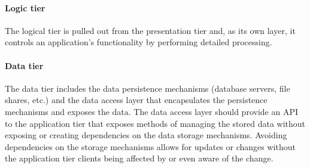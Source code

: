 \paragraph{Logic tier}
The logical tier is pulled out from the presentation tier and, as its own layer, it controls an application’s functionality by performing detailed processing.

\paragraph{Data tier}
The data tier includes the data persistence mechanisms (database servers, file shares, etc.) and the data access layer that encapsulates the persistence mechanisms and exposes the data. The data access layer should provide an API to the application tier that exposes methods of managing the stored data without exposing or creating dependencies on the data storage mechanisms. Avoiding dependencies on the storage mechanisms allows for updates or changes without the application tier clients being affected by or even aware of the change.




